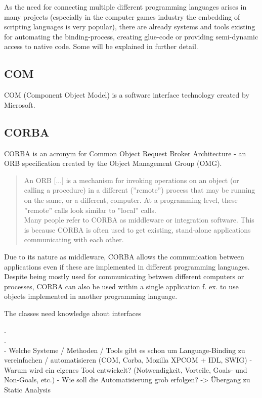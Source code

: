 As the need for connecting multiple different programming languages arises in many projects (especially in the computer games industry the embedding of scripting languages is very popular), there are already systems and tools existing for automating the binding-process, creating glue-code or providing semi-dynamic access to native code. Some will be explained in further detail.

\subsection{}

\subsection{COM}

COM (Component Object Model) is a software interface technology created by Microsoft.

\subsection{CORBA}

CORBA is an acronym for Common Object Request Broker Architecture - an ORB specification created by the Object Management Group (OMG).

\begin{quotation}
An ORB [...] is a mechanism for invoking operations on an object (or calling a procedure) in a different (''remote'') process that may be running on the same, or a different, computer. At a programming level, these ''remote'' calls look similar to ''local'' calls.\\
Many people refer to CORBA as middleware or integration software. This is because CORBA is often used to get existing, stand-alone applications communicating with each other.
\end{quotation}

Due to its nature as middleware, CORBA allows the communication between applications even if these are implemented in different programming languages. Despite being mostly used for communicating between different computers or processes, CORBA can also be used within a single application f. ex. to use objects implemented in another programming language.

The classes need knowledge about interfaces

.\\
.\\
  - Welche Systeme / Methoden / Tools gibt es schon um Language-Binding zu vereinfachen / automatisieren (COM, Corba, Mozilla XPCOM + IDL, SWIG)
  - Warum wird ein eigenes Tool entwickelt? (Notwendigkeit, Vorteile, Goals- und Non-Goals, etc.)
  - Wie soll die Automatisierung grob erfolgen? -> Übergang zu Static Analysis